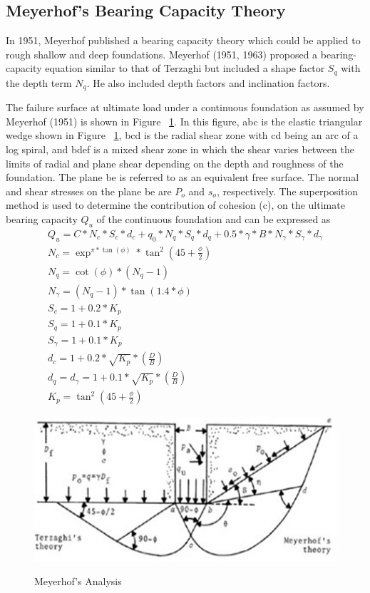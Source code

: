 \subsection{Meyerhof’s Bearing Capacity Theory}
In 1951, Meyerhof published a bearing capacity theory which could be applied to rough shallow and deep foundations. Meyerhof (1951, 1963) proposed a bearing-capacity equation similar to that of Terzaghi but included a shape factor $S_q$ with the depth term $N_q$. He also included depth factors and inclination factors.\cite{mey_book}
\par
The failure surface at ultimate load under a continuous foundation as assumed by Meyerhof (1951) is shown in Figure ~\ref{meyerhof-analysis}. In this figure, abc is the elastic triangular wedge shown in Figure ~\ref{meyerhof-analysis}, bcd is the radial shear zone with cd being an arc of a log spiral, and bdef is a mixed shear zone in which the shear varies between the limits of radial and plane shear depending on the depth and roughness of the foundation. The plane be is referred to as an equivalent free surface. The normal and shear stresses on the plane be are $P_o$ and $s_o$, respectively. The superposition method is used to determine the contribution of cohesion (c), on the ultimate bearing capacity $Q_u$ of the continuous foundation and can be expressed as
\begin{gather}
Q_u = C * N_c * S_c * d_c + q_0 * N_q * S_q * d_q + 0.5 * {\gamma} * B * N_{\gamma}*S_{\gamma}*d_{\gamma}\\
N_c = \exp^{\pi * \tan(\phi)} * \tan^2 ( 45 + \frac{\phi}{2} )\\
N_q = \cot(\phi)*(N_q - 1)\\
N_{\gamma} = (N_q-1) * \tan(1.4*\phi)\\
S_c = 1 + 0.2 * K_p\\
S_q=1+0.1*K_p\\
S_{\gamma}=1+0.1*K_p\\
d_c=1+0.2*\sqrt{K_p}*(\frac{D}{B})\\
d_q=d_{\gamma}=1+0.1*\sqrt{K_p}*(\frac{D}{B})\\
K_p= \tan ^ 2 (45 + \frac{\phi}{2})
\end{gather}
\begin{figure}
\centering
\caption{Meyerhof’s Analysis\cite{mey_book}}
\includegraphics{images/main/meyerhof-analysis.png}
\label{meyerhof-analysis}
\end{figure}

